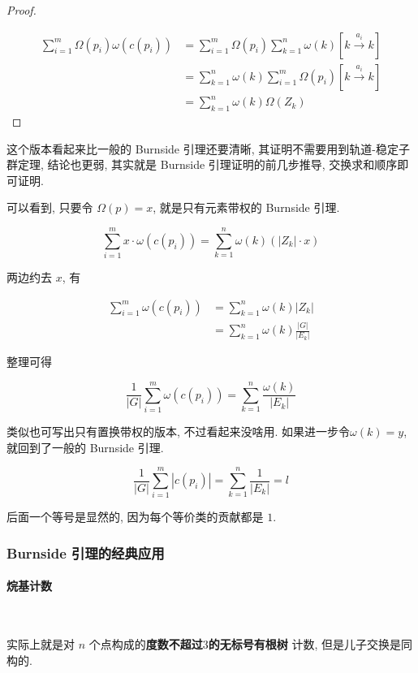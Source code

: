\documentclass{ctexart}
\begin{document}
\begin{proof}\ 
    
    \begin{align*}
        \sum_{i=1}^{m}\Omega(p_i)\omega(c(p_i)) &= \sum_{i=1}^{m}\Omega(p_i)\sum_{k=1}^{n} \omega(k)[k \xrightarrow{a_i} k] \\
                                                &= \sum_{k=1}^{n}\omega(k)\sum_{i=1}^{m} \Omega(p_i)[k \xrightarrow{a_i} k] \\
                                                &= \sum_{k=1}^{n}\omega(k)\Omega(Z_k)
    \end{align*}
\end{proof}

这个版本看起来比一般的 Burnside 引理还要清晰, 
其证明不需要用到轨道-稳定子群定理, 
结论也更弱, 
其实就是 Burnside 引理证明的前几步推导,
交换求和顺序即可证明.

可以看到, 只要令 $\Omega(p)=x$, 就是只有元素带权的 Burnside 引理.

$$
    \sum_{i=1}^{m}x\cdot \omega(c(p_i)) = \sum_{k=1}^{n}\omega(k)(|Z_k|\cdot x)
$$

两边约去 $x$, 有

\begin{align*}
    \sum_{i=1}^{m}\omega(c(p_i)) &= \sum_{k=1}^{n}\omega(k)|Z_k|\\
                                 &= \sum_{k=1}^{n}\omega(k)\frac{|G|}{|E_k|}
\end{align*}

整理可得

$$
    \frac{1}{|G|}\sum_{i=1}^{m}\omega(c(p_i)) = \sum_{k=1}^{n}\frac{\omega(k)}{|E_k|}
$$

类似也可写出只有置换带权的版本, 不过看起来没啥用.
如果进一步令$\omega(k)=y$, 就回到了一般的 Burnside 引理.

$$
    \frac{1}{|G|}\sum_{i=1}^{m}|c(p_i)| = \sum_{k=1}^{n}\frac{1}{|E_k|} = l
$$

后面一个等号是显然的, 因为每个等价类的贡献都是 $1$.
\subsubsection{Burnside 引理的经典应用}
\paragraph{烷基计数}\ 

实际上就是对 $n$ 个点构成的\textbf{度数不超过$3$的无标号有根树} 计数, 但是儿子交换是同构的.
\end{document}
